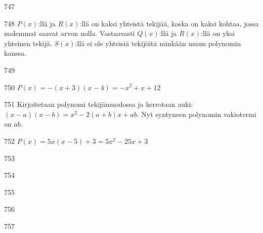 \begin{Vastaus}{747}
\end{Vastaus}
\begin{Vastaus}{748}
	$P(x)$:llä ja $R(x)$:llä on kaksi yhteistä tekijää, koska on kaksi kohtaa, jossa molemmat saavat arvon nolla. Vastaavasti $Q(x)$:llä ja $R(x)$:llä on yksi yhteinen tekijä. $S(x)$:llä ei ole yhteisiä tekijöitä minkään muun polynomin kanssa.
    
\end{Vastaus}
\begin{Vastaus}{749}
    
\end{Vastaus}
\begin{Vastaus}{750}
        $P(x)=-(x+3)(x-4)=-x^2+x+12$
    
\end{Vastaus}
\begin{Vastaus}{751}
        Kirjoitetaan polynomi tekijämuodossa ja kerrotaan auki: $(x-a)(x-b)=x^2-2(a+b)x+ab$. Nyt syntyneen polynomin vakiotermi on $ab$.
    
\end{Vastaus}
\begin{Vastaus}{752}
        $P(x)=5x(x-5)+3=5x^2-25x+3$
    
\end{Vastaus}
\begin{Vastaus}{753}
        \alakohdat{
            § $x=\frac14$ ja $y=5\frac58$.
            § $x=-\frac{b}{2a}$ %
        }
    
\end{Vastaus}
\begin{Vastaus}{754}
    
\end{Vastaus}
\begin{Vastaus}{755}
	
\end{Vastaus}
\begin{Vastaus}{756}
\end{Vastaus}
\begin{Vastaus}{757}
    
\end{Vastaus}
